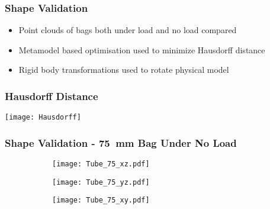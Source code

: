 \documentclass[serif, pdf]{beamer}
\begin{document}

\begin{frame}
\frametitle{Shape Validation}
\begin{itemize}
\item<1-> Point clouds of bags both under load and no load compared
\item<2-> Metamodel based optimisation used to minimize Hausdorff distance
\item<3-> Rigid body transformations used to rotate physical model 
\end{itemize}


\end{frame}

\begin{frame}
\frametitle{Hausdorff Distance}
\begin{center}
\texttt{[image: Hausdorff]}
\end{center}
\end{frame}


\begin{frame}
\frametitle{Shape Validation - 75~mm Bag Under No Load}
\begin{figure}[h!]
\begin{subfigure}{.5\textwidth}
  \centering
  \texttt{[image: Tube\_75\_xz.pdf]}
  \label{fig:Point_Cloud_75_No-Load_xz}
\end{subfigure}%
\begin{subfigure}{.5\textwidth}
  \centering
  \texttt{[image: Tube\_75\_yz.pdf]}
  \label{fig:Point_Cloud_75_No-Load_yz}
\end{subfigure}
\begin{subfigure}{\textwidth}
  \centering
  \texttt{[image: Tube\_75\_xy.pdf]}
  \label{fig:Point_Cloud_75_No-Load_xy}
\end{subfigure}
\end{figure}
\end{frame}
\end{document}
